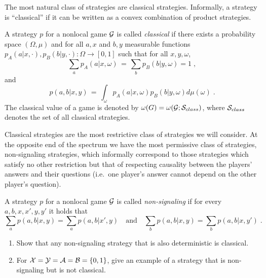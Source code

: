 The most natural class of strategies are classical strategies. Informally, a strategy is ``classical'' if it can be written as a convex combination of product strategies. 

\begin{definition}
A strategy $p$ for a nonlocal game $\mathcal{G}$ is called \emph{classical} if there exists a probability space $(\Omega,\mu)$ and for all $a,x$ and $b,y$ measurable functions $p_A(a|x,\cdot),p_B(b|y,\cdot):\Omega\to [0,1]$ such that for all $x,y,\omega$, 
\[\sum_a p_A(a|x,\omega)\,=\,\sum_b p_B(b|y,\omega)=1\;,\]
 and 
\[p(a,b|x,y)\,=\,\int_\omega p_A(a|x,\omega)p_B(b|y,\omega)d\mu(\omega)\;.\] 
The classical value of a game is denoted by $\omega(G) = \omega(\mathcal{G};\mathcal{S}_{class})$, where $\mathcal{S}_{class}$ denotes the set of all classical strategies. 
\end{definition}

Classical strategies are the most restrictive class of strategies we will consider. At the opposite end of the spectrum we have the most permissive class of strategies, non-signaling strategies, which informally correspond to those strategies which satisfy no other restriction but that of respecting causality between the players' answers and their questions (i.e.\ one player's answer cannot depend on the other player's question). 

\begin{definition}
A strategy $p$ for a nonlocal game $\mathcal{G}$ is called \emph{non-signaling} if for every $a,b,x,x',y,y'$ it holds that 
\[ \sum_{a} p(a,b|x,y) = \sum_{a} p(a,b|x',y) \quad\text{and}\quad \sum_{b} p(a,b|x,y) = \sum_{b} p(a,b|x,y')\;.\]
\end{definition}

\begin{exercise}
\begin{enumerate}
\item Show that any non-signaling strategy that is also deterministic is classical.
\item For $\mathcal{X}=\mathcal{Y}=\mathcal{A}=\mathcal{B}=\{0,1\}$, give an example of a strategy that is non-signaling but is not classical. 
\end{enumerate}
\end{exercise}

